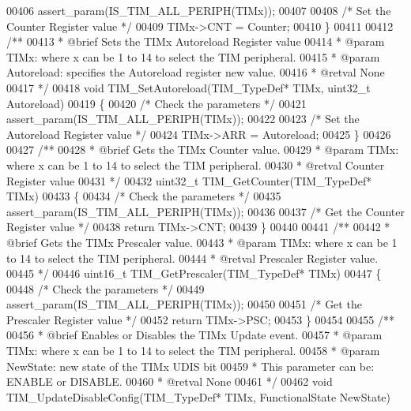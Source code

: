 \begin{DoxyCode}
00406    assert_param(IS\_TIM\_ALL\_PERIPH(TIMx));
00407 
00408   \textcolor{comment}{/* Set the Counter Register value */}
00409   TIMx->CNT = Counter;
00410 \}
00411 
00412 \textcolor{comment}{/**}
00413 \textcolor{comment}{  * @brief  Sets the TIMx Autoreload Register value}
00414 \textcolor{comment}{  * @param  TIMx: where x can be 1 to 14 to select the TIM peripheral.}
00415 \textcolor{comment}{  * @param  Autoreload: specifies the Autoreload register new value.}
00416 \textcolor{comment}{  * @retval None}
00417 \textcolor{comment}{  */}
00418 \textcolor{keywordtype}{void} TIM_SetAutoreload(TIM\_TypeDef* TIMx, uint32\_t Autoreload)
00419 \{
00420   \textcolor{comment}{/* Check the parameters */}
00421   assert_param(IS\_TIM\_ALL\_PERIPH(TIMx));
00422 
00423   \textcolor{comment}{/* Set the Autoreload Register value */}
00424   TIMx->ARR = Autoreload;
00425 \}
00426 
00427 \textcolor{comment}{/**}
00428 \textcolor{comment}{  * @brief  Gets the TIMx Counter value.}
00429 \textcolor{comment}{  * @param  TIMx: where x can be 1 to 14 to select the TIM peripheral.}
00430 \textcolor{comment}{  * @retval Counter Register value}
00431 \textcolor{comment}{  */}
00432 uint32\_t TIM_GetCounter(TIM\_TypeDef* TIMx)
00433 \{
00434   \textcolor{comment}{/* Check the parameters */}
00435   assert_param(IS\_TIM\_ALL\_PERIPH(TIMx));
00436 
00437   \textcolor{comment}{/* Get the Counter Register value */}
00438   \textcolor{keywordflow}{return} TIMx->CNT;
00439 \}
00440 
00441 \textcolor{comment}{/**}
00442 \textcolor{comment}{  * @brief  Gets the TIMx Prescaler value.}
00443 \textcolor{comment}{  * @param  TIMx: where x can be 1 to 14 to select the TIM peripheral.}
00444 \textcolor{comment}{  * @retval Prescaler Register value.}
00445 \textcolor{comment}{  */}
00446 uint16\_t TIM_GetPrescaler(TIM\_TypeDef* TIMx)
00447 \{
00448   \textcolor{comment}{/* Check the parameters */}
00449   assert_param(IS\_TIM\_ALL\_PERIPH(TIMx));
00450 
00451   \textcolor{comment}{/* Get the Prescaler Register value */}
00452   \textcolor{keywordflow}{return} TIMx->PSC;
00453 \}
00454 
00455 \textcolor{comment}{/**}
00456 \textcolor{comment}{  * @brief  Enables or Disables the TIMx Update event.}
00457 \textcolor{comment}{  * @param  TIMx: where x can be 1 to 14 to select the TIM peripheral.}
00458 \textcolor{comment}{  * @param  NewState: new state of the TIMx UDIS bit}
00459 \textcolor{comment}{  *          This parameter can be: ENABLE or DISABLE.}
00460 \textcolor{comment}{  * @retval None}
00461 \textcolor{comment}{  */}
00462 \textcolor{keywordtype}{void} TIM_UpdateDisableConfig(TIM\_TypeDef* TIMx, FunctionalState NewState)

\end{DoxyCode}
